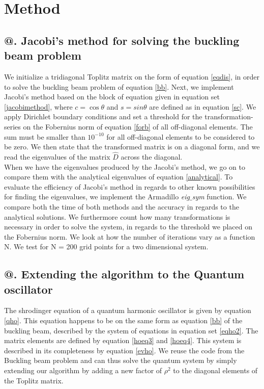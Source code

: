 \documentclass[%
reprint,
amsmath,amssymb,
aps,
]{revtex4-1}
\makeatletter
\newcommand*{\rom}[1]{\expandafter\@slowromancap\romannumeral #1@}
\makeatother
\begin{document}
\section*{Method}
\subsection*{\rom{1}. Jacobi's method for solving the buckling beam problem}
\noindent We initialize a tridiagonal Toplitz matrix on the form of equation \ref{eqdis}, in order to solve the buckling beam problem of equation \ref{bb}. Next, we implement Jacobi's method based on the block of equation given in equation set \ref{jacobimethod}, where $c = \cos{\theta}$ and $s = sin{\theta}$ are defined as in equation \ref{sc}. We apply Dirichlet boundary conditions and set a threshold for the transformation-series on the Fobernius norm of equation \ref{forb} of all off-diagonal elements. The sum must be smaller than $10^{-10}$ for all off-diagonal elements to be considered to be zero. We then state that the transformed matrix is on a diagonal form, and we read the eigenvalues of the matrix $\hat{D}$ across the diagonal. \\ \indent 
When we have the eigenvalues produced by the Jacobi's method, we go on to compare them with the analytical eigenvalues of equation \ref{analytical}. To evaluate the efficiency of Jacobi's method in regards to other known possibilities for finding the eigenvalues, we implement the Armadillo \textit{eig$\_$sym} function. We compare both the time of both methods and the accuracy in regards to the analytical solutions. We furthermore count how many transformations is necessary in order to solve the system, in regards to the threshold we placed on the Fobernius norm. We look at how  the number of iterations vary as a function N. We test for N = 200 grid points for a two dimensional system. 

\subsection*{\rom{2}. Extending the algorithm to the Quantum oscillator} \noindent
The shrodinger equation of a quantum harmonic oscillator is given by  equation \ref{qho}. This equation happens to be on the same form as equation \ref{bb} of the buckling beam, described by the system of equations in equation set \ref{eqho2}. The matrix elements are defined by equation \ref{hoeq3} and \ref{hoeq4}. This system is described in its completeness by equation \ref{evho}. We reuse the code from the Buckling beam problem and can thus solve the quantum system by simply extending our algorithm by adding a new factor of $\rho^2$ to the diagonal elements of the Toplitz matrix. 
\end{document}
